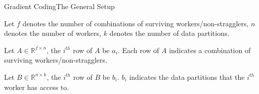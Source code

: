 \documentclass{beamer}
\begin{document}
\begin{frame}{Gradient Coding}{The General Setup}

\begin{definition}
    Let $f$ denotes the number of combinations of surviving workers/non-stragglers, $n$ denotes the number of workers, $k$ denotes the number of data partitions.
\end{definition}

\begin{definition}
    Let $A \in \mathbb{R}^{f \times n}$, the $i^{th}$ row of $A$ be $a_i$. Each row of $A$ indicates a combination of surviving workers/non-stragglers.
\end{definition}

\begin{definition}
    Let $B \in \mathbb{R}^{n \times k}$, the $i^{th}$ row of $B$ be $b_i$. $b_i$ indicates the data partitions that the $i^{th}$ worker has access to.
\end{definition}

\end{frame}
\end{document}
